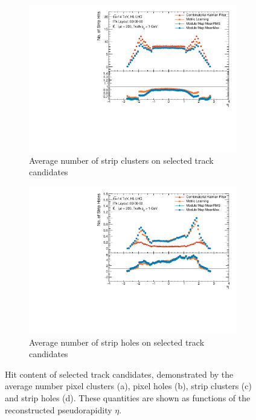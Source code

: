 \begin{figure}[h!]
\begin{subfigure}[b]{0.49\textwidth}
    \centering
    \includegraphics[width=\textwidth]{figures/ckf-gnn/HitsOnTracks/nSCTHits_vs_eta.pdf}
    \caption{Average number of strip clusters on selected track candidates}
    \label{subfig:n-strip-hits}
\end{subfigure}
\begin{subfigure}[b]{0.49\textwidth}
    \centering
    \includegraphics[width=\textwidth]{figures/ckf-gnn/HitsOnTracks/nSCTHoles_vs_eta.pdf}
    \caption{Average number of strip holes on selected track candidates}
    \label{subfig:n-strip-holes}
\end{subfigure}
    \caption{Hit content of selected track candidates, demonstrated by the average number pixel clusters (a), pixel holes (b), strip clusters (c) and strip holes (d). These quantities are shown as functions of the reconstructed pseudorapidity $\eta$.}
    \label{fig:n-hits}
\end{figure}


